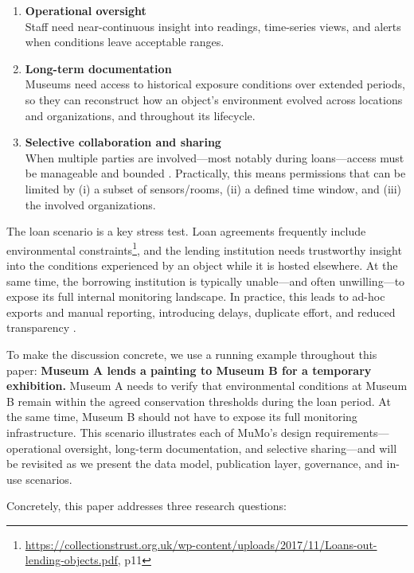 \documentclass{ceurart}
\providecommand{\tightlist}{%
  \setlength{\itemsep}{0pt}\setlength{\parskip}{0pt}}
\begin{document}
\begin{enumerate}
\def\labelenumi{\arabic{enumi}.}
\tightlist
\item
  \textbf{Operational oversight}\\
  Staff need near-continuous insight into readings, time-series views,
  and alerts when conditions leave acceptable ranges.
\item
  \textbf{Long-term documentation}\\
  Museums need access to historical exposure conditions over extended
  periods, so they can reconstruct how an object's environment evolved
  across locations and organizations, and throughout its lifecycle.
\item
  \textbf{Selective collaboration and sharing}\\
  When multiple parties are involved---most notably during
  loans---access must be manageable and bounded \citep{hu2014guide}.
  Practically, this means permissions that can be limited by (i) a
  subset of sensors/rooms, (ii) a defined time window, and (iii) the
  involved organizations.
\end{enumerate}

The loan scenario is a key stress test. Loan agreements frequently
include environmental
constraints\footnote{\url{https://collectionstrust.org.uk/wp-content/uploads/2017/11/Loans-out-lending-objects.pdf}, p11},
and the lending institution needs trustworthy insight into the
conditions experienced by an object while it is hosted elsewhere. At the
same time, the borrowing institution is typically unable---and often
unwilling---to expose its full internal monitoring landscape. In
practice, this leads to ad-hoc exports and manual reporting, introducing
delays, duplicate effort, and reduced transparency
\citep{halevy2006principles, franklin2005databases}.

To make the discussion concrete, we use a running example throughout
this paper: \textbf{Museum A lends a painting to Museum B for a
temporary exhibition.} Museum A needs to verify that environmental
conditions at Museum B remain within the agreed conservation thresholds
during the loan period. At the same time, Museum B should not have to
expose its full monitoring infrastructure. This scenario illustrates
each of MuMo's design requirements---operational oversight, long-term
documentation, and selective sharing---and will be revisited as we
present the data model, publication layer, governance, and in-use
scenarios.

Concretely, this paper addresses three research questions:
\end{document}
